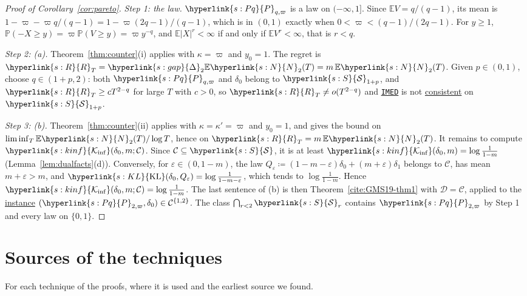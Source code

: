 \documentclass[11pt]{article}
\newcommand{\E}{\mathbb{E}}
\newcommand{\Prob}{\mathbb{P}}
\newcommand{\sy}[2]{{\hyperlink{#1}{#2}}}
\newcommand{\term}[2]{\hyperlink{#1}{#2}}
\newcommand{\imed}{\hyperref[alg:imed]{\texttt{IMED}}}
\newcommand{\Sm}{\sy{s:S}{\mathcal{S}}}
\newcommand{\gap}{\sy{s:gap}{\Delta}}
\newcommand{\KL}{\sy{s:KL}{\mathrm{KL}}}
\newcommand{\Kinf}{\sy{s:kinf}{\mathcal{K}_{\inf}}}
\newcommand{\Np}{\sy{s:N}{N}}
\newcommand{\Reg}{\sy{s:R}{R}}
\newcommand{\Pq}{\sy{s:Pq}{P}}
\begin{document}
\begin{proof}[Proof of Corollary~\ref{cor:pareto}]
\emph{Step 1: the law.} $\Pq_{q,\varpi}$ is a law on $(-\infty,1]$. Since $\E V=q/(q-1)$, its mean is
$1-\varpi-\varpi q/(q-1)=1-\varpi(2q-1)/(q-1)$, which is in $(0,1)$ exactly when $0<\varpi<(q-1)/(2q-1)$. For
$y\ge1$, $\Prob(-X\ge y)=\varpi\Prob(V\ge y)=\varpi y^{-q}$, and $\E|X|^r<\infty$ if and only if
$\E V^r<\infty$, that is $r<q$.

\emph{Step 2: (a).} Theorem~\ref{thm:counter}(i) applies with $\kappa=\varpi$ and $y_0=1$. The regret
is $\Reg_T=\gap_2\E \Np_2(T)=m\,\E \Np_2(T)$. Given $p\in(0,1)$, choose $q\in(1+p,2)$: both
$\Pq_{q,\varpi}$ and $\delta_0$ belong to $\Sm_{1+p}$, and $\Reg_T\ge cT^{2-q}$ for large $T$ with $c>0$, so
$\Reg_T\ne o(T^{2-q})$ and \imed{} is not \term{w:consistent}{consistent} on $\Sm_{1+p}$.

\emph{Step 3: (b).} Theorem~\ref{thm:counter}(ii) applies with $\kappa=\kappa'=\varpi$ and $y_0=1$, and
gives the bound on $\liminf_T\E \Np_2(T)/\log T$, hence on $\Reg_T=m\,\E \Np_2(T)$. It remains to compute
$\Kinf(\delta_0,m;\mathcal C)$. Since $\mathcal C\subseteq\Sm$, it is at least
$\Kinf(\delta_0,m)=\log\frac1{1-m}$ (Lemma~\ref{lem:dualfacts}(d)). Conversely, for
$\varepsilon\in(0,1-m)$, the law $Q_\varepsilon\coloneqq(1-m-\varepsilon)\delta_0+(m+\varepsilon)\delta_1$
belongs to $\mathcal C$, has mean $m+\varepsilon>m$, and $\KL(\delta_0,Q_\varepsilon)=\log\frac1{1-m-\varepsilon}$,
which tends to $\log\frac1{1-m}$. Hence $\Kinf(\delta_0,m;\mathcal C)=\log\frac1{1-m}$. The last
sentence of (b) is then Theorem~\ref{cite:GMS19-thm1} with $\mathcal D=\mathcal C$, applied to the
\term{w:instance}{instance} $(\Pq_{2,\varpi},\delta_0)\in\mathcal C^{\{1,2\}}$. The class $\bigcap_{r<2}\Sm_r$ contains
$\Pq_{2,\varpi}$ by Step 1 and every law on $\{0,1\}$.
\end{proof}

\section{Sources of the techniques}\label{sec:attribution}

For each technique of the proofs, where it is used and the earliest source we found.
\end{document}
